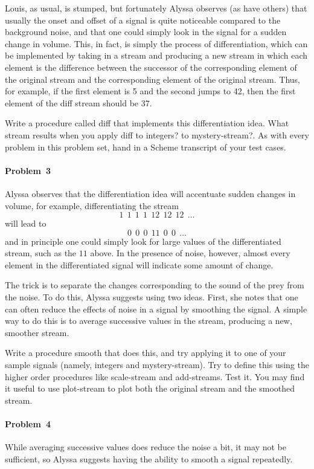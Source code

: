 Louis, as usual, is stumped, but fortunately Alyssa observes (as have
others) that usually the onset and offset of a signal is quite noticeable
compared to the background noise, and that one could simply look in the
signal for a sudden change in volume.  This, in fact, is simply the
process of differentiation, which can be implemented by taking in a
stream and producing a new stream in which each element is
the difference between the successor of the corresponding element of
the original stream and the corresponding element of the original stream.
Thus, for example, if the first element is 5 and the second jumps to 42, then
the first element of the diff stream should be 37.

Write a procedure called {\cf diff} that implements this
differentiation idea.  What stream results when you apply {\cf diff}
to {\cf integers}? to {\cf mystery-stream?}. As with every problem in this
problem set, hand in a {\sc Scheme} transcript of your test cases.


\paragraph{Problem~3}  Alyssa observes that the differentiation idea will
accentuate sudden changes in volume, for example, differentiating the
stream 
\[1\ \ 1 \ \ 1 \ \ 1 \ \ 12 \ \ 12 \ \ 12\ \ \ldots\]
will lead to
\[0 \ \ 0\ \ 0\ \ 11\ \ 0\ \ 0\ \ \ldots\]
and in principle one could simply look for large values of the
differentiated stream, such as the $11$ above.  In the presence of
noise, however, almost every
element in the differentiated signal will indicate some amount of
change.

The trick is to separate the changes corresponding to the sound
of the prey from the noise. To do this, Alyssa suggests using two
ideas.  First, 
she notes that one can often reduce the effects of noise in a signal by
smoothing the signal.  A simple way to do this is to average successive values
in the stream, producing a new, smoother stream.

Write a procedure {\cf
smooth} that does this, and try applying it to one of your sample
signals (namely, {\cf integers} and {\cf mystery-stream}).  Try to define this
using the higher
order procedures like {\cf scale-stream} and {\cf add-streams}. Test it.
You may find it useful to use {\cf plot-stream} to plot both the original
stream and the smoothed stream.

\paragraph{Problem~4}  While averaging successive values does reduce the
noise a bit, it may not be sufficient, so Alyssa suggests having the
ability to smooth a signal repeatedly.

